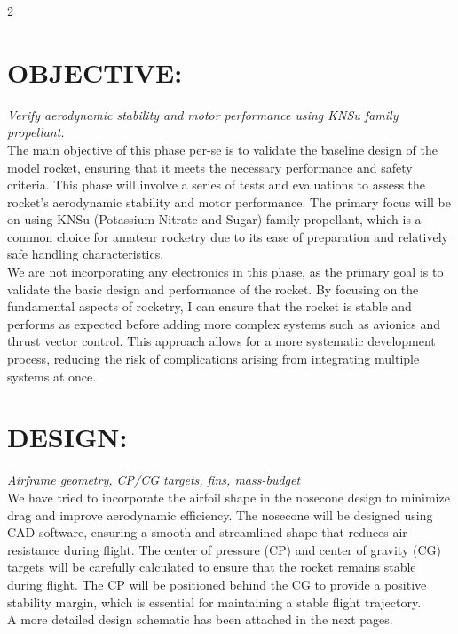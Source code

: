 \documentclass[10pt]{report}
\begin{document}
  \begin{multicols}{2}
      
  \section*{OBJECTIVE:}  \textit{Verify aerodynamic stability and motor performance using KNSu family propellant.} \\
  The main objective of this phase per-se is to validate the baseline design of the model rocket, ensuring that it meets the necessary performance and safety criteria. This phase will involve a series of tests and evaluations to assess the rocket's aerodynamic stability and motor performance. The primary focus will be on using KNSu (Potassium Nitrate and Sugar) family propellant, which is a common choice for amateur rocketry due to its ease of preparation and relatively safe handling characteristics. \\

  We are not incorporating any electronics in this phase, as the primary goal is to validate the basic design and performance of the rocket. By focusing on the fundamental aspects of rocketry, I can ensure that the rocket is stable and performs as expected before adding more complex systems such as avionics and thrust vector control. This approach allows for a more systematic development process, reducing the risk of complications arising from integrating multiple systems at once. \\

  \section*{DESIGN:} \textit{Airframe geometry, CP/CG targets, fins, mass-budget}\\
  We have tried to incorporate the airfoil shape in the nosecone design to minimize drag and improve aerodynamic efficiency. The nosecone will be designed using CAD software, ensuring a smooth and streamlined shape that reduces air resistance during flight. The center of pressure (CP) and center of gravity (CG) targets will be carefully calculated to ensure that the rocket remains stable during flight. The CP will be positioned behind the CG to provide a positive stability margin, which is essential for maintaining a stable flight trajectory. \\

  A more detailed design schematic has been attached in the next pages. \\


\end{multicols}
\end{document}
